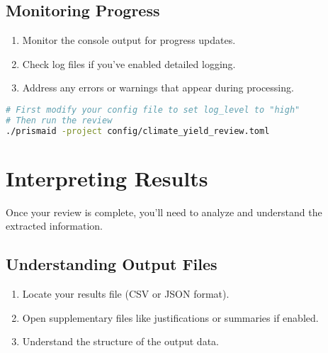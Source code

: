 
\subsection{Monitoring Progress}

\begin{enumerate}
    \item Monitor the console output for progress updates.
    \item Check log files if you've enabled detailed logging.
    \item Address any errors or warnings that appear during processing.
\end{enumerate}

\begin{commandbox}
\begin{lstlisting}[language=Bash]
# First modify your config file to set log_level to "high"
# Then run the review
./prismaid -project config/climate_yield_review.toml
\end{lstlisting}
\end{commandbox}

\section{Interpreting Results}

Once your review is complete, you'll need to analyze and understand the extracted information.

\subsection{Understanding Output Files}

\begin{enumerate}
    \item Locate your results file (CSV or JSON format).
    \item Open supplementary files like justifications or summaries if enabled.
    \item Understand the structure of the output data.
\end{enumerate}

